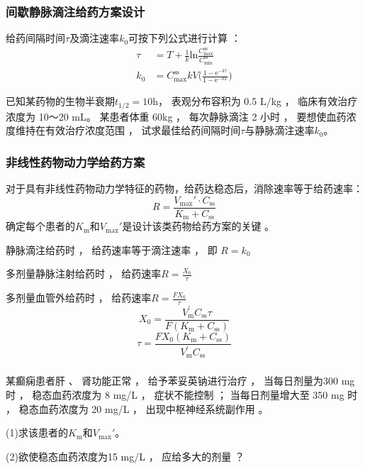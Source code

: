 \documentclass[dvipsnames, svgnames, x11names]{beamer}
\begin{document}
\begin{frame}
    \frametitle{间歇静脉滴注给药方案设计}
    给药间隔时间$\tau$及滴注速率$k_0$可按下列公式进行计算 ：
    \[
        \begin{aligned}
            \tau&=T+\frac1k\mathrm{ln}\frac{C_{\mathrm{max}}^{\mathrm{ss}}}{C_{\mathrm{min}}^{\mathrm{ss}}} \\
            k_0&=C_{\max}^{\mathrm{ss}}kV\Big(\frac{1-\mathrm{e}^{-k\tau}}{1-\mathrm{e}^{-kT}}\Big)
        \end{aligned}
    \]
    \begin{example}
        已知某药物的生物半衰期$t_{1/2}=10$h， 表观分布容积为 0.5 L/kg ， 临床有效治疗浓度为 10～20 mL。 某患者体重 60kg ， 每次静脉滴注 2 小时 ， 要想使血药浓度维持在有效治疗浓度范围 ， 试求最佳给药间隔时间$\tau$与静脉滴注速率$k_0$。
    \end{example}
\end{frame}


\begin{frame}
    \frametitle{非线性药物动力学给药方案}
    对于具有非线性药物动力学特征的药物，给药达稳态后，消除速率等于给药速率：
    \[
        R = \frac{V_{\mathrm{max}}'\cdot C_\mathrm{ss}}{K_{\mathrm{m}}+C_\mathrm{ss}}
    \]
    确定每个患者的$K_{\mathrm{m}}$和$V_{\mathrm{max}}'$是设计该类药物给药方案的关键 。

    静脉滴注给药时 ， 给药速率等于滴注速率 ， 即 $R=k_0$

    多剂量静脉注射给药时 ， 给药速率$R=\frac{X_0}{\tau}$

    多剂量血管外给药时 ， 给药速率$R=\frac{FX_0}{\tau}$
    \[
        X_0=\frac{V_\mathrm{m}^{\prime}C_\mathrm{ss}\tau}{F(K_\mathrm{m}+C_\mathrm{ss})}
    \]
    \[
        \tau=\frac{FX_{0}(K_{\mathrm{m}}+C_{\mathrm{ss}})}{V_{\mathrm{m}}^{\prime}C_{\mathrm{ss}}}
    \]
\end{frame}


\begin{frame}[t]
    \frametitle{}
    \begin{example}
        某癫痫患者肝 、 肾功能正常 ， 给予苯妥英钠进行治疗 ， 当每日剂量为300 mg时 ， 稳态血药浓度为 8 mg/L ， 症状不能控制 ； 当每日剂量增大至 350 mg 时 ， 稳态血药浓度为 20 mg/L ， 出现中枢神经系统副作用 。
        
        (1)求该患者的$K_{\mathrm{m}}$和$V_{\mathrm{max}}'$。
        
        (2)欲使稳态血药浓度为15 mg/L ， 应给多大的剂量 ？
    \end{example}
\end{frame}
\end{document}
